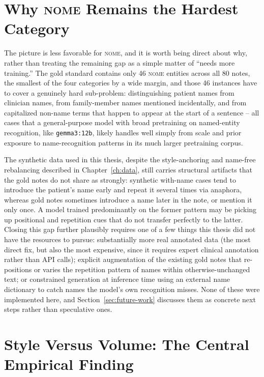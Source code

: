 \documentclass[12pt,a4paper]{report}
\newcommand{\NOME}{\textsc{nome}}
\begin{document}
\section{Why \NOME{} Remains the Hardest Category}

The picture is less favorable for \NOME{}, and it is worth being direct about why, rather than treating the remaining gap as a simple matter of ``needs more training.'' The gold standard contains only 46 \NOME{} entities across all 80 notes, the smallest of the four categories by a wide margin, and those 46 instances have to cover a genuinely hard sub-problem: distinguishing patient names from clinician names, from family-member names mentioned incidentally, and from capitalized non-name terms that happen to appear at the start of a sentence -- all cases that a general-purpose model with broad pretraining on named-entity recognition, like \texttt{gemma3:12b}, likely handles well simply from scale and prior exposure to name-recognition patterns in its much larger pretraining corpus.

The synthetic data used in this thesis, despite the style-anchoring and name-free rebalancing described in Chapter~\ref{ch:data}, still carries structural artifacts that the gold notes do not share as strongly: synthetic with-name cases tend to introduce the patient's name early and repeat it several times via anaphora, whereas gold notes sometimes introduce a name later in the note, or mention it only once. A model trained predominantly on the former pattern may be picking up positional and repetition cues that do not transfer perfectly to the latter. Closing this gap further plausibly requires one of a few things this thesis did not have the resources to pursue: substantially more real annotated data (the most direct fix, but also the most expensive, since it requires expert clinical annotation rather than API calls); explicit augmentation of the existing gold notes that re-positions or varies the repetition pattern of names within otherwise-unchanged text; or constrained generation at inference time using an external name dictionary to catch names the model's own recognition misses. None of these were implemented here, and Section~\ref{sec:future-work} discusses them as concrete next steps rather than speculative ones.

\section{Style Versus Volume: The Central Empirical Finding}
\end{document}
